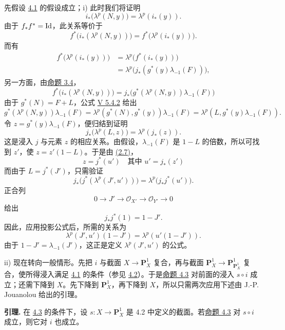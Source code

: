 先假设 \hyperlink{sga6.e07.lem.4-1}{4.1} 的假设成立；i) 此时我们将证明
\[
  i_*\bigl(\lambda^p(N,y)\bigr)=\lambda^p(i_*(y)).
\]
由于 \(f_*f^*=\operatorname{Id}\)，此关系等价于
\[
  f^*\bigl(i_*(\lambda^p(N,y))\bigr)=
  f^*\bigl(\lambda^p(i_*(y))\bigr).
\]
而有
\[
\begin{aligned}
 f^*\bigl(\lambda^p(i_*(y))\bigr)
 &=\lambda^p\bigl(f^*(i_*(y))\bigr)\\
 &=\lambda^p\bigl(j_*(g^*(y)\lambda_{-1}(F))\bigr),
\end{aligned}
\tag{3.4}
\]
另一方面，由\hyperlink{sga6.e07.prop.3-4}{命题 3.4}，
\[
  f^*\bigl(i_*(\lambda^p(N,y))\bigr)
  =
  j_*\bigl(g^*(\lambda^p(N,y))\lambda_{-1}(F)\bigr)
  \tag{3.4}
\]
由于 \(g^*(N)=F+L\)，公式 \hyperlink{sga6.e05.eq.5-4-2}{V 5.4.2} 给出
\[
  g^*(\lambda^p(N,y))\lambda_{-1}(F)
  =
  \lambda^p(g^*(N),g^*(y))\lambda_{-1}(F)
  =
  \lambda^p(L,g^*(y)\lambda_{-1}(F)).
\]
令 \(z=g^*(y)\lambda_{-1}(F)\)，便归结到证明
\[
  j_*\bigl(\lambda^p(L,z)\bigr)=\lambda^p(j_*(z)).
\]
这是浸入 \(j\) 与元素 \(z\) 的相应关系。由假设，\(\lambda_{-1}(F)\) 是 \(1-L\) 的倍数，所以可找到 \(z'\)，使 \(z=z'(1-L)\)。于是由 \hyperlink{sga6.e07.para.2-6}{(2.7)}，
\[
   z=j^*(u')\quad\text{其中 }u'=j_*(z')
\]
而由于 \(L=j^*(J')\)，只需验证
\[
  j_*\bigl(j^*(\lambda^p(J',u'))\bigr)=
  \lambda^p\bigl(j_*j^*(u')\bigr).
\]
正合列
\[
  0\longrightarrow J'\longrightarrow \mathcal O_{X'}
  \longrightarrow \mathcal O_{Y'}\longrightarrow 0
\]
给出
\begin{equation}\tag{4.3.2}
  j_*j^*(1)=1-J'.
\end{equation}
因此，应用投影公式后，所需的关系为
\[
  \lambda^p(J',u')(1-J')=\lambda^p(u'(1-J')).
\]
由于 \(1-J'=\lambda_{-1}(J')\)，这正是定义 \(\lambda^p(J',u')\) 的公式。

ii) 现在转向一般情形。先把 \(i\) 与截面 \(X\to\mathbf P_X^1\) 复合，再与截面 \(\mathbf P_X^1\to\mathbf P_{\mathbf P_X^1}^1\) 复合，使所得浸入满足 \hyperlink{sga6.e07.lem.4-1}{4.1} 的条件（参见 \hyperlink{sga6.e07.sec.4.2}{4.2}）。于是\hyperlink{sga6.e07.thm.4-3}{命题 4.3} 对前面的浸入 \(s\circ i\) 成立；还需下降到 \(X\)。先下降到 \(\mathbf P_X^1\)，再下降到 \(X\)，所以只需两次应用下述由 J.-P. Jouanolou 给出的引理。

\textbf{引理.} 在 \hyperlink{sga6.e07.thm.4-3}{4.3} 的条件下，设 \(s:X\to\mathbf P_X^1\) 是 4.2 中定义的截面。若\hyperlink{sga6.e07.thm.4-3}{命题 4.3} 对 \(s\circ i\) 成立，则它对 \(i\) 也成立。

